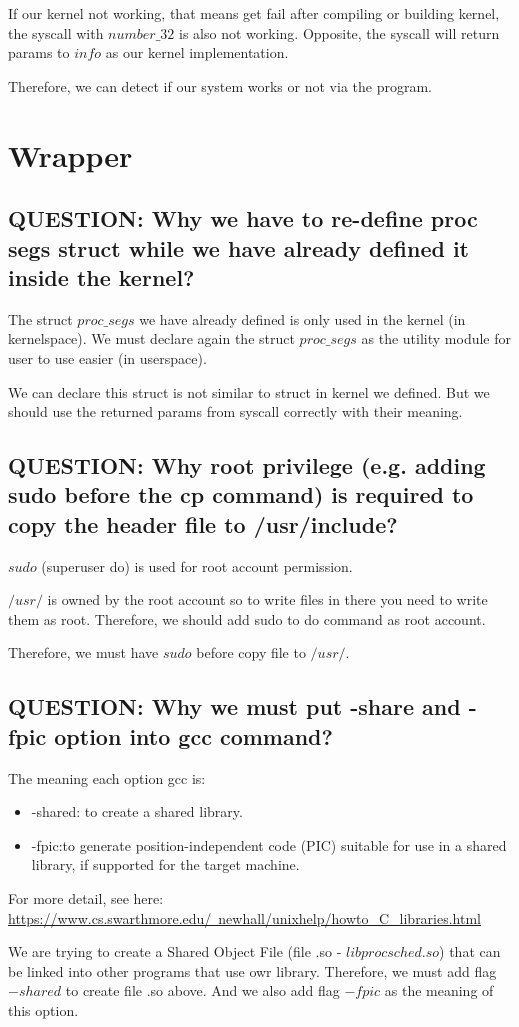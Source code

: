 \noindent If our kernel not working, that means get fail after compiling or building kernel, the syscall with $ number\_32 $ is also not working.
Opposite, the syscall will return params to $ info $ as our kernel implementation.

\noindent Therefore, we can detect if our system works or not via the program.

\section{Wrapper}

\subsection{QUESTION: Why we have to re-define proc segs struct while we have already defined it inside the kernel?}

The struct $ proc\_segs $ we have already defined is only used in the kernel (in kernelspace). We must declare again the struct $ proc\_segs $ as the utility module for user to use easier (in userspace).

\noindent We can declare this struct is not similar to struct in kernel we defined. But we should use the returned params from syscall correctly with their meaning.


\subsection{QUESTION: Why root privilege (e.g. adding sudo before the cp command) is required to copy the header file to /usr/include?}

$ sudo $ (superuser do) is used for root account permission.

\noindent $ /usr/ $ is owned by the root account so to write files in there you need to write them as root. Therefore, we should add sudo to do command as root account.

Therefore, we must have $ sudo $ before copy file to $ /usr/ $.

\subsection{QUESTION: Why we must put -share and -fpic option into gcc command?}
The meaning each option gcc is:
\begin{itemize}
	\item -shared: to create a shared library.
	\item -fpic:to generate position-independent code (PIC) suitable for use in a shared library, if supported for the target machine.
\end{itemize}

\noindent For more detail, see here: \href{https://www.cs.swarthmore.edu/~newhall/unixhelp/howto_C_libraries.html}{https://www.cs.swarthmore.edu/~newhall/unixhelp/howto\_C\_libraries.html}

\noindent We are trying to create a Shared Object File (file .so - $ libprocsched.so $) that can be linked into other programs that use owr library. Therefore, we must add flag $ -shared $ to create file .so above. And we also add flag $ -fpic $ as the meaning of this option.